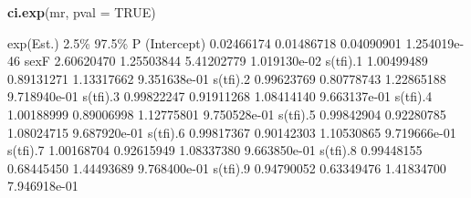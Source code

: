 \documentclass[
]{book}
\newenvironment{Shaded}{\begin{snugshade}}{\end{snugshade}}
\newcommand{\AttributeTok}[1]{\textcolor[rgb]{0.13,0.29,0.53}{#1}}
\newcommand{\ConstantTok}[1]{\textcolor[rgb]{0.56,0.35,0.01}{#1}}
\newcommand{\FunctionTok}[1]{\textcolor[rgb]{0.13,0.29,0.53}{\textbf{#1}}}
\newcommand{\NormalTok}[1]{#1}
\begin{document}
\begin{enumerate}
\begin{Shaded}
\end{Shaded}

\begin{Shaded}
\begin{Highlighting}[]
\FunctionTok{ci.exp}\NormalTok{(mr, }\AttributeTok{pval =} \ConstantTok{TRUE}\NormalTok{)}
\end{Highlighting}
\end{Shaded}

\begin{Shaded}
\begin{Highlighting}[]
\NormalTok{             exp(Est.)       2.5\%      97.5\%            P}
\NormalTok{(Intercept) 0.02466174 0.01486718 0.04090901 1.254019e{-}46}
\NormalTok{sexF        2.60620470 1.25503844 5.41202779 1.019130e{-}02}
\NormalTok{s(tfi).1    1.00499489 0.89131271 1.13317662 9.351638e{-}01}
\NormalTok{s(tfi).2    0.99623769 0.80778743 1.22865188 9.718940e{-}01}
\NormalTok{s(tfi).3    0.99822247 0.91911268 1.08414140 9.663137e{-}01}
\NormalTok{s(tfi).4    1.00188999 0.89006998 1.12775801 9.750528e{-}01}
\NormalTok{s(tfi).5    0.99842904 0.92280785 1.08024715 9.687920e{-}01}
\NormalTok{s(tfi).6    0.99817367 0.90142303 1.10530865 9.719666e{-}01}
\NormalTok{s(tfi).7    1.00168704 0.92615949 1.08337380 9.663850e{-}01}
\NormalTok{s(tfi).8    0.99448155 0.68445450 1.44493689 9.768400e{-}01}
\NormalTok{s(tfi).9    0.94790052 0.63349476 1.41834700 7.946918e{-}01}
\end{Highlighting}
\end{Shaded}


\end{enumerate}
\end{document}
